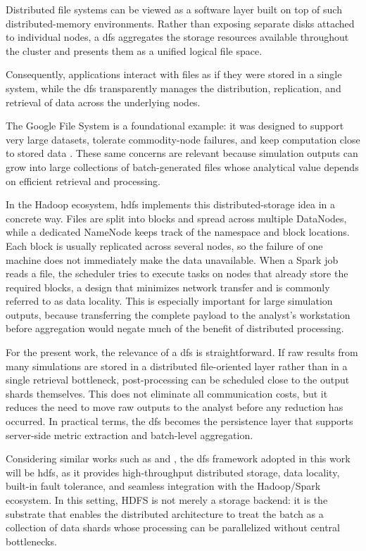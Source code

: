 \begin{sloppypar}
Distributed file systems can be viewed as a software layer built on top of such
distributed-memory environments. Rather than exposing separate disks attached to
individual nodes, a \gls{dfs} aggregates the storage resources available throughout
the cluster and presents them as a unified logical file space.
\end{sloppypar} Consequently, applications interact with files as if they were stored in a single system, while the \gls{dfs} transparently manages the distribution, replication, and retrieval of data across the underlying nodes.

The Google File System is a foundational example: it was designed to support very large datasets, tolerate commodity-node failures, and keep computation close to stored data \parencite{ghemawat2003gfs}. These same concerns are relevant because simulation outputs can grow into large collections of batch-generated files whose analytical value depends on efficient retrieval and processing.

In the Hadoop ecosystem, \gls{hdfs} implements this distributed-storage idea in a concrete way. Files are split into blocks and spread across multiple DataNodes, while a dedicated NameNode keeps track of the namespace and block locations. Each block is usually replicated across several nodes, so the failure of one machine does not immediately make the data unavailable. When a Spark job reads a file, the scheduler tries to execute tasks on nodes that already store the required blocks, a design that minimizes network transfer and is commonly referred to as data locality. This is especially important for large simulation outputs, because transferring the complete payload to the analyst's workstation before aggregation would negate much of the benefit of distributed processing.

For the present work, the relevance of a \gls{dfs} is straightforward. If raw results from many simulations are stored in a distributed file-oriented layer rather than in a single retrieval bottleneck, post-processing can be scheduled close to the output shards themselves. This does not eliminate all communication costs, but it reduces the need to move raw outputs to the analyst before any reduction has occurred. In practical terms, the \gls{dfs} becomes the persistence layer that supports server-side metric extraction and batch-level aggregation.

Considering similar works such as \textcite{li2018postprocessing} and \textcite{morrissey2020velassco}, the \gls{dfs} framework adopted in this work will be \gls{hdfs}, as it provides high-throughput distributed storage, data locality, built-in fault tolerance, and seamless integration with the Hadoop/Spark ecosystem. In this setting, HDFS is not merely a storage backend: it is the substrate that enables the distributed architecture to treat the batch as a collection of data shards whose processing can be parallelized without central bottlenecks.

